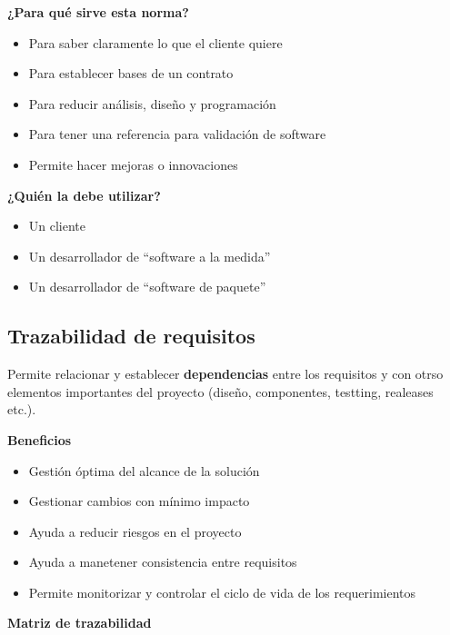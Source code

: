 \documentclass{article}
\begin{document}
\textbf{¿Para qué sirve esta norma?}

\begin{itemize}
	\item
		Para saber claramente lo que el cliente quiere
	\item
		Para establecer bases de un contrato
	\item
		Para reducir análisis, diseño y programación
	\item
		Para tener una referencia para validación de software
	\item
		Permite hacer mejoras o innovaciones
\end{itemize}

\vspace{1em}
\textbf{¿Quién la debe utilizar?}

\begin{itemize}
	\item
		Un cliente
	\item
		Un desarrollador de ``software a la medida''
	\item
		Un desarrollador de ``software de paquete''
\end{itemize}

\subsection{Trazabilidad de requisitos}

Permite relacionar y establecer \textbf{dependencias} entre los requisitos y con
otrso elementos importantes del proyecto (diseño, componentes, testting, realeases
etc.).

\vspace{1em}
\textbf{Beneficios}

\begin{itemize}
	\item
		Gestión óptima del alcance de la solución
	\item
		Gestionar cambios con mínimo impacto
	\item
		Ayuda a reducir riesgos en el proyecto
	\item
		Ayuda a manetener consistencia entre requisitos
	\item
		Permite monitorizar y controlar el ciclo de vida de los
		requerimientos
\end{itemize}

\vspace{1em}
\textbf{Matriz de trazabilidad}

\vspace{1em}
\end{document}

